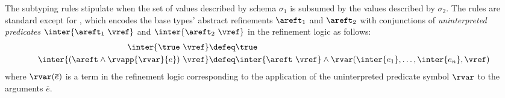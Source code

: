 The subtyping rules stipulate when the set of values described 
by schema $\sigma_1$ is subsumed by the values described by $\sigma_2$.
The rules are standard except for \tsubVar, which encodes the base types' 
abstract refinements $\areft_1$ and $\areft_2$ with conjunctions of 
\emph{uninterpreted predicates} 
$\inter{\areft_1\ \vref}$ and $\inter{\areft_2\ \vref}$ in the 
refinement logic as follows:
\begin{align*}
\inter{\true\ \vref} & \defeq \true\\
\inter{(\areft \land \rvapp{\rvar}{e})\ \vref} & \defeq \inter{\areft\
\vref} \land \rvar(\inter{e_1},\ldots,\inter{e_n},\vref)
\end{align*}
where $\rvar(\overline{e})$ is a term in the refinement logic corresponding
to the application of the uninterpreted predicate symbol $\rvar$ to the 
arguments $\overline{e}$.



